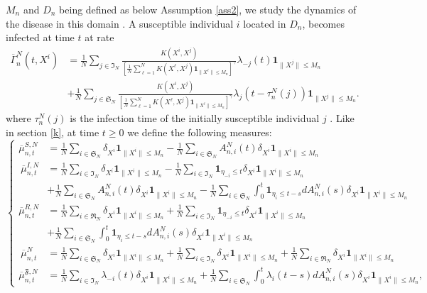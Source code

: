 \documentclass[notitlepage,reqno,11pt]{amsart}
\numberwithin{equation}{section}
\begin{document}
$M_n$ and $D_n$ being defined as below Assumption  \ref{ass2}, we study the dynamics of the disease in this domain . A susceptible individual $i$ located in $D_{n}$, becomes infected  at time $t$ at rate
\begin{equation}
\label{2}
\begin{aligned}
\overline{\Gamma}^N_{n}(t,X^i)&=\frac{1}{N}\displaystyle  \sum_{j\in\mathfrak{I}_N} \frac{K(X^{i},X^{j})}{\left[\displaystyle \frac{1}{N} \sum_{\ell=1}^N K(X^{\ell},X^{j})\mathbf{1}_{\|X^{\ell}\|\leq M_n}\right]^{\gamma}} \lambda_{-j}(t) \mathbf{1}_{\|X^j\|\leq M_n} \\
&+ \frac{1}{N}\sum_{j\in\mathfrak{S}_N} \frac{K(X^{i},X^{j})}{\left[\displaystyle \frac{1}{N} \sum_{\ell=1}^N K(X^{\ell},X^{j})\mathbf{1}_{\|X^{\ell}\|\leq M_n}\right]^{\gamma}} \lambda_{j}(t- \tau_{n}^N(j))\mathbf{1}_{\|X^j\|\leq M_n}.
\end{aligned}
\end{equation}
where $\tau_{n}^N(j)$ is the infection time of the initially susceptible individual $j$ . Like in section \ref{k}, at time $t\geq 0$ we define the following measures:
\begin{equation}
\left\lbrace
\begin{aligned}
\overline{\mu}_{n,t}^{S,N}&=\frac{1}{N}\sum_{i\in\mathfrak{S}_N} \delta_{X^{i}}\mathbf{1}_{\|X^i\|\leq M_n}-\frac{1}{N} \sum_{i\in\mathfrak{S}_N} A^N_{n,i}(t)\delta_{X^{i}}\mathbf{1}_{\|X^i\|\leq M_n}\\\
\overline{\mu}_{n,t}^{I,N}&=\frac{1}{N}\sum_{i\in\mathfrak{I}_N} \delta_{X^{i}}\mathbf{1}_{\|X^i\|\leq M_n}- \frac{1}{N}\sum_{i\in\mathfrak{I}_N} \mathbf{1}_{\eta_{-i}\leq  t}\delta_{X^{i}}\mathbf{1}_{\|X^i\|\leq M_n}\\
&+\frac{1}{N}\sum_{i\in\mathfrak{S}_N}A^N_{n,i}(t)\delta_{X^{i}}\mathbf{1}_{\|X^i\|\leq M_n}-\frac{1}{N}
\sum_{i\in\mathfrak{S}_N}\int_0^t\mathbf{1}_{\eta_{i}\leq t-s}dA^N_{n,i}(s)\delta_{X^{i}}\mathbf{1}_{\|X^i\|\leq M_n}\\
\overline{\mu}_{n,t}^{R,N}&=\frac{1}{N}\sum_{i\in\mathfrak{R}_N} \delta_{X^{i}}\mathbf{1}_{\|X^i\|\leq M_n}+\frac{1}{N}\sum_{i\in\mathfrak{I}_N} \mathbf{1}_{\eta_{-i}\leq t}\delta_{X^{i}}\mathbf{1}_{\|X^i\|\leq M_n}\\
&+\frac{1}{N}\sum_{i\in\mathfrak{S}_N} \int_0^t\mathbf{1}_{\eta_{i}\leq t-s}dA^N_{n,i}(s)\delta_{X^{i}}\mathbf{1}_{\|X^i\|\leq M_n}\\\
\overline{\mu}_{n,t}^{N}
&=\frac{1}{N}\sum_{i\in\mathfrak{S}_N} \delta_{X^{i}}\mathbf{1}_{\|X^i\|\leq M_n}+ \frac{1}{N}\sum_{i\in\mathfrak{I}_N} \delta_{X^{i}}\mathbf{1}_{\|X^i\|\leq M_n}+ \frac{1}{N}\sum_{i\in\mathfrak{R}_N} \delta_{X^{i}}\mathbf{1}_{\|X^i\|\leq M_n}\\
\overline{\mu}_{n,t}^{\mathfrak{F},N} &=  \frac{1}{N}\sum_{i\in\mathfrak{I}_N} \lambda_{-i}(t)\delta_{X^{i}}\mathbf{1}_{\|X^i\|\leq M_n} +  \frac{1}{N}\sum_{i\in\mathfrak{S}_N} \int_0^t \lambda_i(t-s)dA^N_{n,i}(s)\delta_{X^{i}}\mathbf{1}_{\|X^i\|\leq M_n},
\end{aligned}
\right.
\end{equation}
\end{document}
